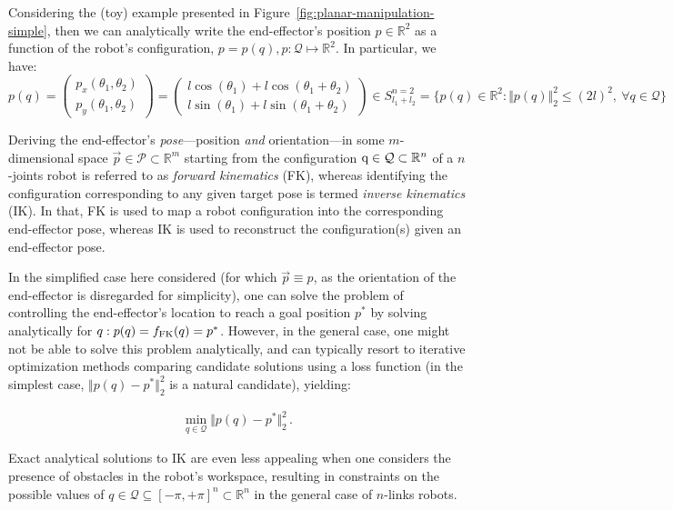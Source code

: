 Considering the (toy) example presented in Figure~\ref{fig:planar-manipulation-simple}, then we can analytically write the end-effector's position \( p \in \mathbb R^2 \) as a function of the robot's configuration, \( p = p(q), p: \mathcal Q \mapsto \mathbb R^2 \). 
In particular, we have:
\begin{equation*}
p(q) = 
\begin{pmatrix}
p_x(\theta_1, \theta_2) \\  
p_y(\theta_1, \theta_2)
\end{pmatrix}
=
\begin{pmatrix}
l \cos(\theta_1) + l \cos(\theta_1 + \theta_2) \\
l \sin(\theta_1) + l \sin(\theta_1 + \theta_2)
\end{pmatrix}
\in S^{n=2}_{l_1+l_2} = \{ p(q) \in \mathbb R^2: \Vert p(q) \Vert_2^2 \leq (2l)^2, \ \forall q \in \mathcal Q \}
\end{equation*}

Deriving the end-effector's \emph{pose}---position \emph{and} orientation---in some \(m\)-dimensional space \( \vec{p} \in \mathcal{P} \subset \mathbb{R}^{m} \) starting from the configuration \( {\textnormal{q}} \in \mathcal Q \subset \mathbb R^n \) of a \( n \)-joints robot is referred to as \emph{forward kinematics} (FK), whereas identifying the configuration corresponding to any given target pose is termed \emph{inverse kinematics} (IK).
In that, FK is used to map a robot configuration into the corresponding end-effector pose, whereas IK is used to reconstruct the configuration(s) given an end-effector pose.

In the simplified case here considered (for which \( \vec{p} \equiv p \), as the orientation of the end-effector is disregarded for simplicity), one can solve the problem of controlling the end-effector's location to reach a goal position \( p^* \) by solving analytically for \( q: p(q) = f_{\text{FK}}(q) = p^*\).
However, in the general case, one might not be able to solve this problem analytically, and can typically resort to iterative optimization methods comparing candidate solutions using a loss function (in the simplest case, \( \Vert p(q) - p^* \Vert_2^2 \) is a natural candidate), yielding:

\begin{align}
\min_{q \in \mathcal Q} \Vert p(q) - p^* \Vert_2^2 \, .
\label{eq:ik_problem}
\end{align}

Exact analytical solutions to IK are even less appealing when one considers the presence of obstacles in the robot's workspace, resulting in constraints on the possible values of \( q \in \mathcal Q \subseteq [-\pi, +\pi]^n \subset \mathbb R^n \) in the general case of \(n\)-links robots.


